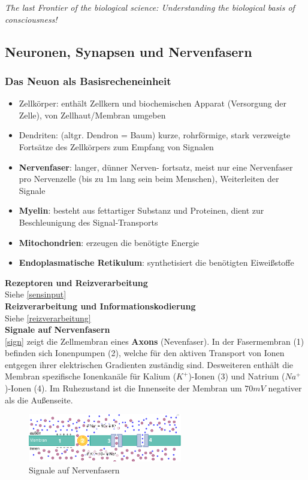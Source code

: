 \emph{The last Frontier of the biological science: Understanding the biological basis of consciousness!}
\subsection{Neuronen, Synapsen und Nervenfasern}
\subsubsection{Das Neuon als Basisrecheneinheit}
\begin{itemize}
\item Zellkörper: enthält Zellkern und biochemischen Apparat (Versorgung der Zelle), von Zellhaut/Membran umgeben
\item Dendriten: (altgr. Dendron = \glqq Baum\grqq) kurze, rohrförmige, stark verzweigte Fortsätze des Zellkörpers zum Empfang von Signalen
\item \textbf{Nervenfaser}: langer, dünner Nerven-
fortsatz, meist nur eine Nervenfaser pro
Nervenzelle (bis zu 1m lang sein beim
Menschen), Weiterleiten der Signale
\item \textbf{Myelin}: besteht aus fettartiger Substanz und Proteinen,
dient zur Beschleunigung des Signal-Transports
\item \textbf{Mitochondrien}: erzeugen die benötigte Energie
\item \textbf{Endoplasmatische Retikulum}: synthetisiert die benötigten Eiweißstoffe
\end{itemize}
\textbf{Rezeptoren und Reizverarbeitung}\\
Siehe \autoref{sensinput}\\
\textbf{Reizverarbeitung und Informationskodierung}\\
Siehe \autoref{reizverarbeitung}\\



\textbf{Signale auf Nervenfasern}\\
\autoref{sign} zeigt die Zellmembran eines \textbf{Axons} (Nevenfaser). In der Fasermembran (1) befinden sich Ionenpumpen (2), welche für den aktiven Transport von Ionen entgegen ihrer elektrischen Gradienten zuständig sind. Desweiteren enthält die Membran spezifische Ionenkanäle für Kalium ($K^+$)-Ionen (3) und Natrium ($Na^+$)-Ionen (4). Im Ruhezustand ist die Innenseite der Membran um $70mV$ negativer als die Außenseite.
\begin{figure}[h!]
	\centering
	\includegraphics[width=0.6\textwidth]{figures/ch07_signale.png}
	\caption{Signale auf Nervenfasern}
	\label{sign}
\end{figure}

